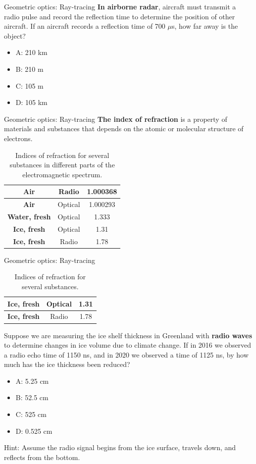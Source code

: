 \documentclass{beamer}
\begin{document}
\begin{frame}{Geometric optics: Ray-tracing}
\textbf{In airborne radar}, aircraft must transmit a radio pulse and record the reflection time to determine the position of other aircraft.  If an aircraft records a reflection time of 700 $\mu$s, how far away is the object?
\begin{itemize}
\item A: 210 km
\item B: 210 m
\item C: 105 m
\item D: 105 km
\end{itemize}
\end{frame}

\begin{frame}{Geometric optics: Ray-tracing}
\textbf{\alert{The index of refraction}} is a property of materials and substances that depends on the atomic or molecular structure of electrons.
\begin{table}
\centering
\begin{tabular}{| c | c | c |}
\hline
\textbf{Air} & Radio & 1.000368 \\ \hline
\textbf{Air} & Optical & 1.000293 \\ \hline
\textbf{Water, fresh} & Optical & 1.333 \\ \hline
\textbf{Ice, fresh} & Optical & 1.31 \\ \hline
\textbf{Ice, fresh} & Radio & 1.78 \\ \hline
\end{tabular}
\caption{\label{tab:n} Indices of refraction for several substances in different parts of the electromagnetic spectrum.}
\end{table}
\end{frame}

\begin{frame}{Geometric optics: Ray-tracing}
\begin{table}
\footnotesize
\centering
\begin{tabular}{| c | c | c |}
\hline
\textbf{Ice, fresh} & Optical & 1.31 \\ \hline
\textbf{Ice, fresh} & Radio & 1.78 \\ \hline
\end{tabular}
\caption{\label{tab:n} \footnotesize Indices of refraction for several substances.}
\end{table}
\footnotesize
Suppose we are measuring the ice shelf thickness in Greenland with \textbf{radio waves} to determine changes in ice volume due to climate change.  If in 2016 we observed a radio echo time of 1150 ns, and in 2020 we observed a time of 1125 ns, by how much has the ice thickness been reduced?
\begin{itemize}
\item A: 5.25 cm
\item B: 52.5 cm
\item C: 525 cm
\item D: 0.525 cm
\end{itemize}
\footnotesize
Hint: Assume the radio signal begins from the ice surface, travels down, and reflects from the bottom.
\end{frame}
\end{document}
